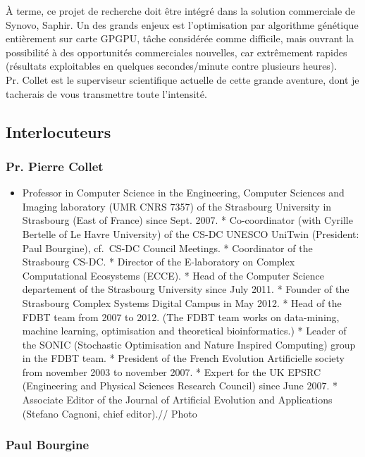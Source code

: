 \documentclass[french, 11pt]{memoir}
\begin{document}
À terme, ce projet de recherche doit être intégré dans la solution
commerciale de Synovo, Saphir. Un des grands enjeux est l'optimisation
par algorithme génétique entièrement sur carte GPGPU, tâche considérée
comme difficile, mais ouvrant la possibilité à des opportunités
commerciales nouvelles, car extrêmement rapides (résultats exploitables
en quelques secondes/minute contre plusieurs heures).\\ 
Pr. Collet est le superviseur scientifique actuelle de cette grande
aventure, dont je tacherais de vous transmettre toute l'intensité.

\subsection{Interlocuteurs}\label{interlocuteurs}

\subsubsection{Pr. Pierre Collet}\label{pr.-pierre-collet}

\begin{itemize}
	\itemsep1pt\parskip0pt
	\item
	Professor in Computer Science in the Engineering, Computer Sciences
	and Imaging laboratory (UMR CNRS 7357) of the Strasbourg University in
	Strasbourg (East of France) since Sept. 2007. * Co-coordinator (with
	Cyrille Bertelle of Le Havre University) of the CS-DC UNESCO UniTwin
	(President: Paul Bourgine), cf.~CS-DC Council Meetings. * Coordinator
	of the Strasbourg CS-DC. * Director of the E-laboratory on Complex
	Computational Ecosystems (ECCE). * Head of the Computer Science
	departement of the Strasbourg University since July 2011. * Founder of
	the Strasbourg Complex Systems Digital Campus in May 2012. * Head of
	the FDBT team from 2007 to 2012. (The FDBT team works on data-mining,
	machine learning, optimisation and theoretical bioinformatics.) *
	Leader of the SONIC (Stochastic Optimisation and Nature Inspired
	Computing) group in the FDBT team. * President of the French Evolution
	Artificielle society from november 2003 to november 2007. * Expert for
	the UK EPSRC (Engineering and Physical Sciences Research Council)
	since June 2007. * Associate Editor of the Journal of Artificial
	Evolution and Applications (Stefano Cagnoni, chief editor).// Photo
\end{itemize}

\subsubsection{Paul Bourgine}\label{paul-bourgine}
\end{document}
